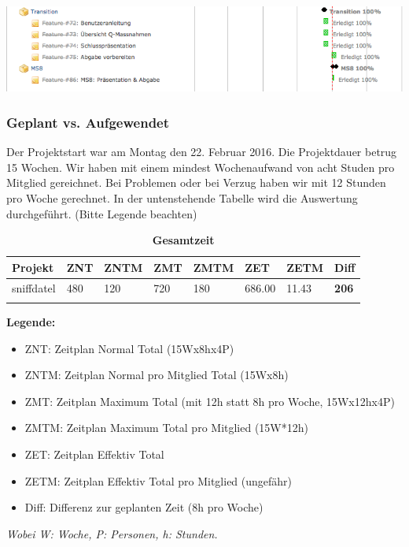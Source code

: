 \documentclass[a4,12pt]{scrartcl}
\begin{document}
\includegraphics[width=1\textwidth]{./pictures/transition.png}\\

\subsubsection{Geplant vs. Aufgewendet}
Der Projektstart war am Montag den 22. Februar 2016. Die Projektdauer betrug 15 Wochen. 
Wir haben mit einem mindest Wochenaufwand von acht Studen pro Mitglied gereichnet. Bei Problemen oder bei Verzug haben wir mit 12 Stunden pro Woche gerechnet. In der untenstehende Tabelle wird die Auswertung durchgeführt. (Bitte Legende beachten) 
\begin{table}[H]
\centering
    \begin{tabular}{@{} p{2cm} p{1cm} p{1cm} p{1cm} p{1cm} p{1cm} p{1cm} p{1cm} @{}}\toprule    
    {Projekt} & {ZNT} & {ZNTM} & {ZMT} & {ZMTM} & {ZET} & {ZETM} & \textbf{{Diff}}\\ \midrule
    sniffdatel & 480 & 120 & 720 & 180 & 686.00 & 11.43 & \textbf{206} \\ \addlinespace
    \bottomrule
    \end{tabular}
\caption{\textbf{Gesamtzeit}}
\end{table}
\textbf{Legende:}
\begin{itemize}
\item ZNT: Zeitplan Normal Total (15Wx8hx4P)  
\item ZNTM: Zeitplan Normal pro Mitglied Total (15Wx8h)
\item ZMT: Zeitplan Maximum Total (mit 12h statt 8h pro Woche, 15Wx12hx4P) 
\item ZMTM: Zeitplan Maximum Total pro Mitglied (15W*12h)
\item ZET: Zeitplan Effektiv Total 
\item ZETM: Zeitplan Effektiv Total pro Mitglied (ungefähr)
\item Diff: Differenz zur geplanten Zeit (8h pro Woche) 
\end{itemize}
\textit{Wobei W: Woche, P: Personen, h: Stunden.}
\end{document}
